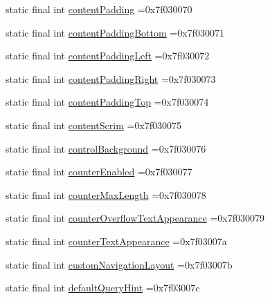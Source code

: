 \begin{DoxyCompactItemize}
\item 
static final int \mbox{\hyperlink{classbr_1_1unb_1_1cic_1_1mp_1_1marketmaster_1_1R_1_1attr_a0c3c7e2765b71318204b3a1c817afcc4}{content\+Padding}} =0x7f030070
\item 
static final int \mbox{\hyperlink{classbr_1_1unb_1_1cic_1_1mp_1_1marketmaster_1_1R_1_1attr_a114b163633c1eaca895eb604952430d0}{content\+Padding\+Bottom}} =0x7f030071
\item 
static final int \mbox{\hyperlink{classbr_1_1unb_1_1cic_1_1mp_1_1marketmaster_1_1R_1_1attr_aeb220e92c6cc167fed73271e7de9d4b6}{content\+Padding\+Left}} =0x7f030072
\item 
static final int \mbox{\hyperlink{classbr_1_1unb_1_1cic_1_1mp_1_1marketmaster_1_1R_1_1attr_a02fa49d6482d3beca07948544c9412dc}{content\+Padding\+Right}} =0x7f030073
\item 
static final int \mbox{\hyperlink{classbr_1_1unb_1_1cic_1_1mp_1_1marketmaster_1_1R_1_1attr_a96692815209f786ff5f3b981dfa4a3bc}{content\+Padding\+Top}} =0x7f030074
\item 
static final int \mbox{\hyperlink{classbr_1_1unb_1_1cic_1_1mp_1_1marketmaster_1_1R_1_1attr_aca7588e2022e131e4fc06d05f02816e2}{content\+Scrim}} =0x7f030075
\item 
static final int \mbox{\hyperlink{classbr_1_1unb_1_1cic_1_1mp_1_1marketmaster_1_1R_1_1attr_ae8243f3859b19a9b2459b5305f8740e9}{control\+Background}} =0x7f030076
\item 
static final int \mbox{\hyperlink{classbr_1_1unb_1_1cic_1_1mp_1_1marketmaster_1_1R_1_1attr_a87dcdbc993055535e06b414a8f4f6b0b}{counter\+Enabled}} =0x7f030077
\item 
static final int \mbox{\hyperlink{classbr_1_1unb_1_1cic_1_1mp_1_1marketmaster_1_1R_1_1attr_addedf06c8be378963898486edd8a202a}{counter\+Max\+Length}} =0x7f030078
\item 
static final int \mbox{\hyperlink{classbr_1_1unb_1_1cic_1_1mp_1_1marketmaster_1_1R_1_1attr_aae0c8b70ce07b66eec90c0e71a10c145}{counter\+Overflow\+Text\+Appearance}} =0x7f030079
\item 
static final int \mbox{\hyperlink{classbr_1_1unb_1_1cic_1_1mp_1_1marketmaster_1_1R_1_1attr_a6ed38c76f04ac0416a2201c0e0dedab1}{counter\+Text\+Appearance}} =0x7f03007a
\item 
static final int \mbox{\hyperlink{classbr_1_1unb_1_1cic_1_1mp_1_1marketmaster_1_1R_1_1attr_ab2e5f2be40b9c8b5974e8eb1819f6dd1}{custom\+Navigation\+Layout}} =0x7f03007b
\item 
static final int \mbox{\hyperlink{classbr_1_1unb_1_1cic_1_1mp_1_1marketmaster_1_1R_1_1attr_add03ebd2786a7efea54e8351d8628bdb}{default\+Query\+Hint}} =0x7f03007c

\end{DoxyCompactItemize}
